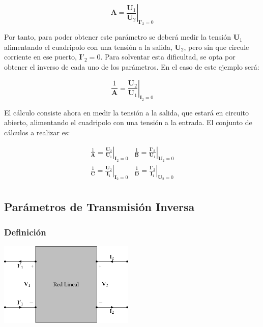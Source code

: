 \begin{equation}
  \mathbf{A} = \left.\frac{\mathbf{U}_1}{\mathbf{U}_2}\right\rvert_{\mathbf{I'}_2 = 0} 
\end{equation}

Por tanto, para poder obtener este parámetro se deberá medir la tensión $\mathbf{U}_1$ alimentando el cuadripolo con una tensión a la salida, $\mathbf{U}_2$, pero sin que circule corriente en ese puerto, $\mathbf{I'}_2 = 0$. Para solventar esta dificultad, se opta por obtener el inverso de cada uno de los parámetros. En el caso de este ejemplo será:

\begin{equation}
  \frac{1}{\mathbf{A}} = \left.\frac{\mathbf{U}_2}{\mathbf{U}_1}\right\rvert_{\mathbf{I}_2 = 0} 
\end{equation}

El cálculo consiste ahora en medir la tensión a la salida, que estará en circuito abierto, alimentando el cuadripolo con una tensión a la entrada. El conjunto de cálculos a realizar es:


\[
  \begin{array}{cc}
    \frac{1}{\mathbf{A}} = \left.\frac{\mathbf{U}_2}{\mathbf{U}_1}\right\rvert_{\mathbf{I}_2 = 0} &
    \frac{1}{\mathbf{B}} = \left.\frac{\mathbf{I'}_2}{\mathbf{U}_1}\right\rvert_{\mathbf{U}_2 = 0}\\
    \frac{1}{\mathbf{C}} = \left.\frac{\mathbf{U}_2}{\mathbf{I}_1}\right\rvert_{\mathbf{I}_2 = 0} &
    \frac{1}{\mathbf{D}} = \left.\frac{\mathbf{I'}_2}{\mathbf{I}_1}\right\rvert_{\mathbf{U}_2 = 0}\\
  \end{array}
\]


\subsection{Parámetros de Transmisión Inversa}
\label{sec:orgd62a71b}

\subsubsection{Definición}
\label{sec:org52b179c}

\includegraphics[height=4cm]{../figs/cuadripolo_transmision_inversa.pdf}


